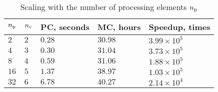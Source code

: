 \begin{table}[h]
  \vspace{-0.5em}
  \centering
  \caption{Scaling with the number of processing elements \textnormal{${n_\text{p}}$}}
  \vspace{-0.5em}
  \begin{tabular*}{1\linewidth}{L{20pt}L{15pt}R{50pt}R{50pt}R{60pt}}
    \toprule
    ${n_\text{p}}$ & ${n_\text{v}}$ & PC, seconds & MC, hours & Speedup, times \\
    \midrule
    \midrule
    $ 2$ & $2$ & $0.28$ & $30.98$ & $3.99 \times 10^5$ \\
    $ 4$ & $3$ & $0.30$ & $31.04$ & $3.73 \times 10^5$ \\
    $ 8$ & $4$ & $0.59$ & $31.06$ & $1.88 \times 10^5$ \\
    $16$ & $5$ & $1.37$ & $38.97$ & $1.03 \times 10^5$ \\
    $32$ & $6$ & $6.78$ & $40.27$ & $2.14 \times 10^4$ \\
    \bottomrule
  \end{tabular*}
  \vspace{-0.5em}
\end{table}
